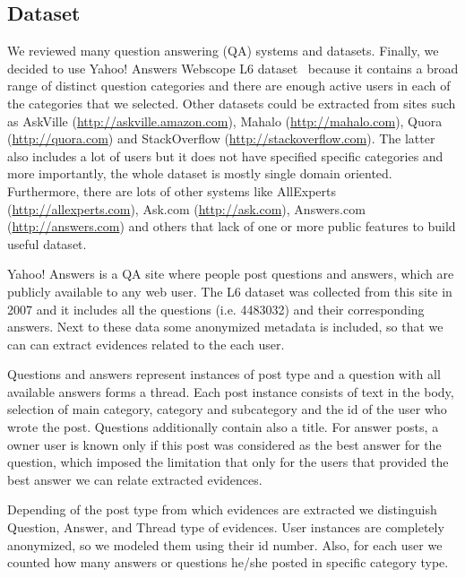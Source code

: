 \documentclass[conference]{IEEEtran}
\begin{document}
\vspace{-0.3cm}
\subsection{Dataset}
\label{sec:dataset}
We reviewed many question answering (QA) systems and datasets. Finally, we decided to use Yahoo! Answers Webscope L6 dataset~\cite{bib:yahool6} because it contains a broad range of distinct question categories and there are enough active users in each of the categories that we selected. Other datasets could be extracted from sites such as AskVille (\url{http://askville.amazon.com}), Mahalo (\url{http://mahalo.com}), Quora (\url{http://quora.com}) and StackOverflow (\url{http://stackoverflow.com}). The latter also includes a lot of users but it does not have specified specific categories and more importantly, the whole dataset is mostly single domain oriented. Furthermore, there are lots of other systems like AllExperts (\url{http://allexperts.com}), Ask.com (\url{http://ask.com}), Answers.com (\url{http://answers.com}) and others that lack of one or more public features to build useful dataset.

Yahoo! Answers is a QA site where people post questions and answers, which are publicly available to any web user. The L6 dataset was collected from this site in 2007 and it includes all the questions (i.e. 4483032) and their corresponding answers. Next to these data some anonymized metadata is included, so that we can can extract evidences related to the each user.

Questions and answers represent instances of post type and a question with all available answers forms a thread. Each post instance consists of text in the body, selection of main category, category and subcategory and the id of the user who wrote the post. Questions additionally contain also a title. For answer posts, a owner user is known only if this post was considered as the best answer for the question, which imposed the limitation that only for the users that provided the best answer we can relate extracted evidences.

Depending of the post type from which evidences are extracted we distinguish Question, Answer, and Thread type of evidences. User instances are completely anonymized, so we modeled them using their id number. Also, for each user we counted how many answers or questions he/she posted in specific category type.
\end{document}
